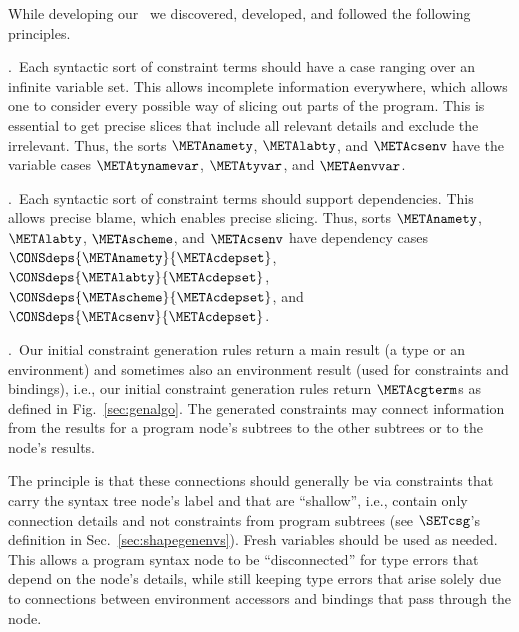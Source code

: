 \documentclass{jfp1}
\begin{document}
While developing our \TES\ we discovered, developed, and followed the
following principles.

\principleA.\ Each syntactic sort of constraint terms should have a
case ranging over an infinite variable set.
This allows incomplete information everywhere, which allows one to
consider every possible way of slicing out parts of the program.
This is essential to get precise slices that include all relevant
details and exclude the irrelevant.
Thus, the sorts
%
$\METAnamety$,
%
$\METAlabty$, and
%
$\METAcsenv$
%
have the variable cases
%
$\METAtynamevar$,
%
$\METAtyvar$, and
%
$\METAenvvar$.
%

\principleB.\ Each syntactic sort of constraint terms should support
dependencies.
This allows precise blame, which enables precise
slicing.
Thus, sorts
%
%
$\METAnamety$,
%
$\METAlabty$,
%
$\METAscheme$, and
%
$\METAcsenv$
%
have dependency cases
%
%
$\CONSdeps{\METAnamety}{\METAcdepset}$,
%
$\CONSdeps{\METAlabty}{\METAcdepset}$,
%
$\CONSdeps{\METAscheme}{\METAcdepset}$, and
%
$\CONSdeps{\METAcsenv}{\METAcdepset}$.

\principleC.\ Our initial constraint generation rules return a main
result (a type or an environment) and sometimes also an environment
result (used for constraints and bindings), i.e., our initial
constraint generation rules return $\METAcgterm$s as defined in
Fig.~\ref{sec:genalgo}.
The generated constraints may connect information from the results for
a program node's subtrees to the other subtrees or to the node's
results.

The principle is that these connections should generally be via
constraints that carry the syntax tree node's label and that are
``shallow'', i.e., contain only connection details and not constraints
from program subtrees (see $\SETcsg$'s definition in
Sec.~\ref{sec:shapegenenvs}).
%
Fresh variables should be used as needed.  This allows a program
syntax node to be ``disconnected'' for type errors that depend on the
node's details, while still keeping type errors that arise solely due
to connections between environment accessors and bindings that pass
through the node.
\end{document}
